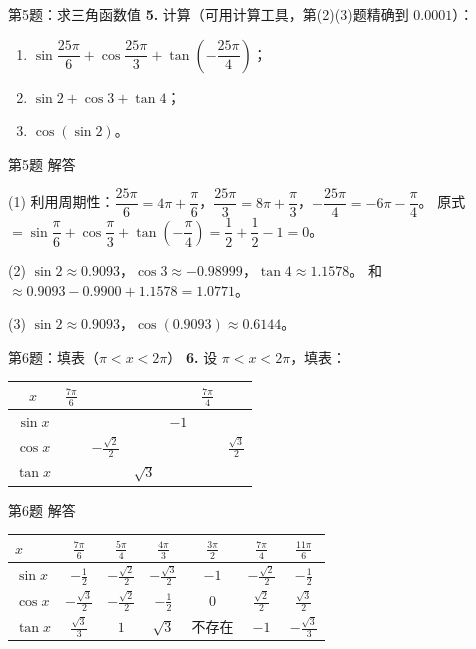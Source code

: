 \documentclass[10pt,aspectratio=169,serif]{beamer}
\begin{document}
\begin{frame}[t]{第5题：求三角函数值}
\textbf{5.} 计算（可用计算工具，第(2)(3)题精确到 $0.0001$）：
\begin{enumerate}
  \item $\sin\dfrac{25\pi}{6}+\cos\dfrac{25\pi}{3}+\tan\!\left(-\dfrac{25\pi}{4}\right)$；
  \item $\sin 2+\cos 3+\tan 4$；
  \item $\cos(\sin 2)$。
\end{enumerate}
\end{frame}

\begin{frame}[t]{第5题 解答}
\begin{tcolorbox}[colback=orange!10,colframe=orange,title=\textbf{解}]
(1) 利用周期性：$\dfrac{25\pi}{6}=4\pi+\dfrac{\pi}{6}$，$\dfrac{25\pi}{3}=8\pi+\dfrac{\pi}{3}$，$-\dfrac{25\pi}{4}=-6\pi-\dfrac{\pi}{4}$。
原式 $=\sin\dfrac{\pi}{6}+\cos\dfrac{\pi}{3}+\tan\!\left(-\dfrac{\pi}{4}\right)=\dfrac12+\dfrac12-1=0$。

(2) $\sin 2\approx 0.9093$，$\cos 3\approx -0.98999$，$\tan 4\approx 1.1578$。
和 $\approx 0.9093-0.9900+1.1578=1.0771$。

(3) $\sin 2\approx 0.9093$，$\cos(0.9093)\approx 0.6144$。
\end{tcolorbox}
\end{frame}

\begin{frame}[t]{第6题：填表（$\pi<x<2\pi$）}
\textbf{6.} 设 $\pi<x<2\pi$，填表：
\begin{center}
\begin{tabular}{|c|c|c|c|c|c|c|}
\hline
$x$ & $\frac{7\pi}{6}$ &  &  &  & $\frac{7\pi}{4}$ & \\
\hline
$\sin x$ &  &  &  & $-1$ &  & \\
\hline
$\cos x$ &  & $-\frac{\sqrt2}{2}$ &  &  &  & $\frac{\sqrt3}{2}$ \\
\hline
$\tan x$ &  &  & $\sqrt3$ &  &  & \\
\hline
\end{tabular}
\end{center}
\end{frame}

\begin{frame}[t]{第6题 解答}
\begin{tcolorbox}[colback=orange!10,colframe=orange,title=\textbf{解}]
\begin{tabular}{l|cccccc}
$x$ & $\frac{7\pi}{6}$ & $\frac{5\pi}{4}$ & $\frac{4\pi}{3}$ & $\frac{3\pi}{2}$ & $\frac{7\pi}{4}$ & $\frac{11\pi}{6}$\\
\hline
$\sin x$ & $-\frac12$ & $-\frac{\sqrt2}{2}$ & $-\frac{\sqrt3}{2}$ & $-1$ & $-\frac{\sqrt2}{2}$ & $-\frac12$\\
$\cos x$ & $-\frac{\sqrt3}{2}$ & $-\frac{\sqrt2}{2}$ & $-\frac12$ & $0$ & $\frac{\sqrt2}{2}$ & $\frac{\sqrt3}{2}$\\
$\tan x$ & $\frac{\sqrt3}{3}$ & $1$ & $\sqrt3$ & 不存在 & $-1$ & $-\frac{\sqrt3}{3}$
\end{tabular}
\end{tcolorbox}
\end{frame}
\end{document}
